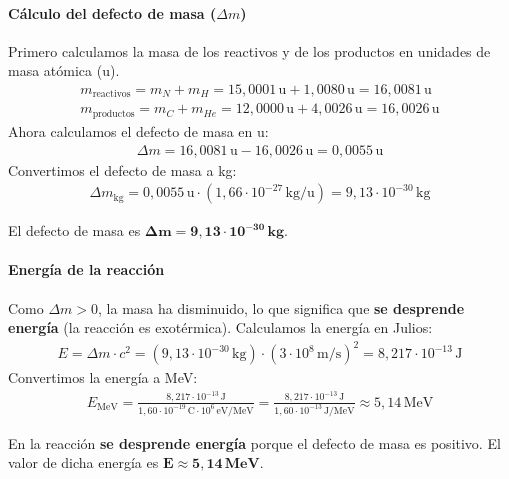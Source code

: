 \paragraph{Cálculo del defecto de masa ($\Delta m$)}
Primero calculamos la masa de los reactivos y de los productos en unidades de masa atómica (u).
\begin{gather}
    m_{\text{reactivos}} = m_N + m_H = 15,0001\,\text{u} + 1,0080\,\text{u} = 16,0081\,\text{u} \\
    m_{\text{productos}} = m_C + m_{He} = 12,0000\,\text{u} + 4,0026\,\text{u} = 16,0026\,\text{u}
\end{gather}
Ahora calculamos el defecto de masa en u:
\begin{gather}
    \Delta m = 16,0081\,\text{u} - 16,0026\,\text{u} = 0,0055\,\text{u}
\end{gather}
Convertimos el defecto de masa a kg:
\begin{gather}
    \Delta m_{\text{kg}} = 0,0055\,\text{u} \cdot (1,66\cdot10^{-27}\,\text{kg/u}) = 9,13\cdot10^{-30}\,\text{kg}
\end{gather}
\begin{cajaresultado}
El defecto de masa es $\boldsymbol{\Delta m = 9,13\cdot10^{-30}\,\textbf{kg}}$.
\end{cajaresultado}

\paragraph{Energía de la reacción}
Como $\Delta m > 0$, la masa ha disminuido, lo que significa que \textbf{se desprende energía} (la reacción es exotérmica).
Calculamos la energía en Julios:
\begin{gather}
    E = \Delta m \cdot c^2 = (9,13\cdot10^{-30}\,\text{kg}) \cdot (3\cdot10^{8}\,\text{m/s})^2 = 8,217\cdot10^{-13}\,\text{J}
\end{gather}
Convertimos la energía a MeV:
\begin{gather}
    E_{\text{MeV}} = \frac{8,217\cdot10^{-13}\,\text{J}}{1,60\cdot10^{-19}\,\text{C} \cdot 10^6\,\text{eV/MeV}} = \frac{8,217\cdot10^{-13}\,\text{J}}{1,60\cdot10^{-13}\,\text{J/MeV}} \approx 5,14\,\text{MeV}
\end{gather}
\begin{cajaresultado}
En la reacción \textbf{se desprende energía} porque el defecto de masa es positivo. El valor de dicha energía es $\boldsymbol{E \approx 5,14\,\textbf{MeV}}$.
\end{cajaresultado}

